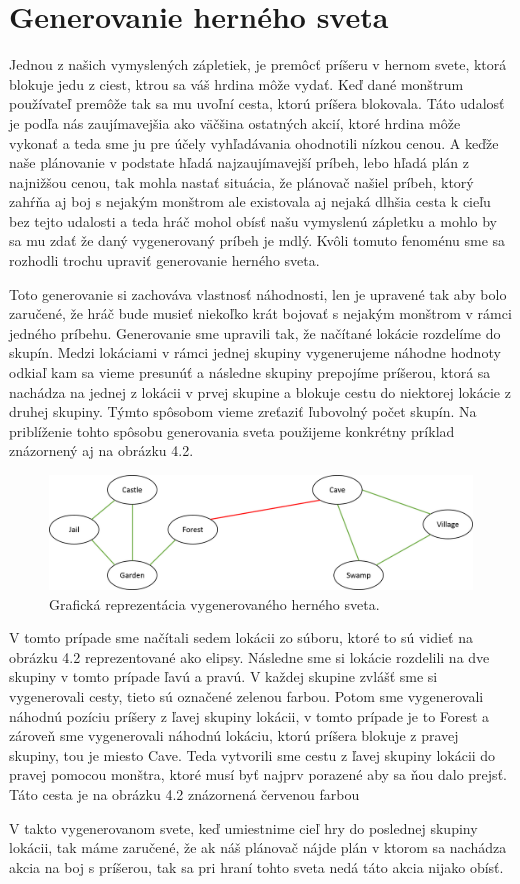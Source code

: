 \section{Generovanie herného sveta}
Jednou z našich vymyslených zápletiek, je premôcť príšeru v hernom svete, ktorá blokuje jedu z ciest, ktrou sa váš hrdina môže vydať. Keď dané monštrum používateľ premôže tak sa mu uvoľní cesta, ktorú príšera blokovala. Táto udalosť je podľa nás zaujímavejšia ako väčšina ostatných akcií, ktoré hrdina môže vykonať a teda sme ju pre účely vyhľadávania ohodnotili nízkou cenou. A keďže naše plánovanie v podstate hľadá najzaujímavejší príbeh, lebo hľadá plán z najnižšou cenou, tak mohla nastať situácia, že plánovač našiel príbeh, ktorý zahŕňa aj boj s nejakým monštrom ale existovala aj nejaká dlhšia cesta k cieľu bez tejto udalosti a teda hráč mohol obísť našu vymyslenú zápletku a mohlo by sa mu zdať že daný vygenerovaný príbeh je mdlý. Kvôli tomuto fenoménu sme sa rozhodli trochu upraviť generovanie herného sveta.\par
Toto generovanie si zachováva vlastnosť náhodnosti, len je upravené tak aby bolo zaručené, že hráč bude musieť niekoľko krát bojovať s nejakým monštrom v rámci jedného príbehu. Generovanie sme upravili tak, že načítané lokácie rozdelíme do skupín. Medzi lokáciami v rámci jednej skupiny vygenerujeme náhodne hodnoty odkiaľ kam sa vieme presunúť a následne skupiny prepojíme príšerou, ktorá sa nachádza na jednej z lokácii v prvej skupine a blokuje cestu do niektorej lokácie z druhej skupiny. Týmto spôsobom vieme zreťaziť ľubovolný počet skupín. Na priblíženie tohto spôsobu generovania sveta použijeme konkrétny príklad znázornený aj na obrázku 4.2.
\begin{figure}[H] 
\begin{center}
\includegraphics[scale=0.4]{img/gen_graf.png}
\caption{Grafická reprezentácia vygenerovaného herného sveta.}
\label{fig:ch42}
\end{center}
\end{figure}
V tomto prípade sme načítali sedem lokácii zo súboru, ktoré to sú vidieť na obrázku 4.2 reprezentované ako elipsy. Následne sme si lokácie rozdelili na dve skupiny v tomto prípade ľavú a pravú. V každej skupine zvlášť sme si vygenerovali cesty, tieto sú označené zelenou farbou. Potom sme vygenerovali náhodnú pozíciu príšery z ľavej skupiny lokácii, v tomto prípade je to Forest a zároveň sme vygenerovali náhodnú lokáciu, ktorú príšera blokuje z pravej skupiny, tou je miesto Cave. Teda vytvorili sme cestu z ľavej skupiny lokácii do pravej pomocou monštra, ktoré musí byť najprv porazené aby sa ňou dalo prejsť. Táto cesta je na obrázku 4.2 znázornená červenou farbou\par
V takto vygenerovanom svete, keď umiestnime cieľ hry do poslednej skupiny lokácii, tak máme zaručené, že ak náš plánovač nájde plán v ktorom sa nachádza akcia na boj s príšerou, tak sa pri hraní tohto sveta nedá táto akcia nijako obísť.
